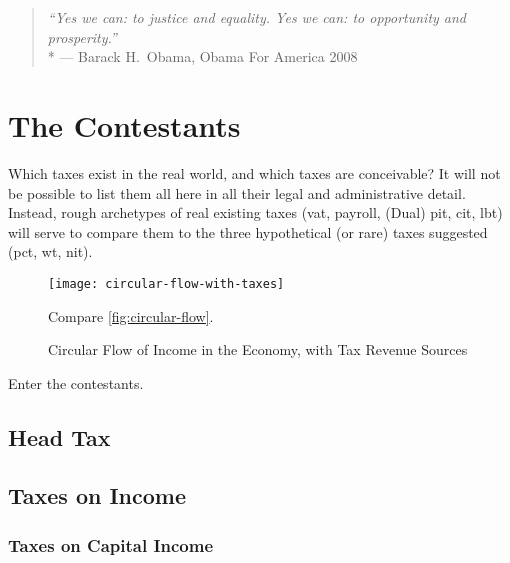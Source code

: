 

\begin{quote}
	\emph{``Yes we can:
	to justice and equality.
	Yes we can:
	to opportunity and prosperity.''}
	\\*
	--- Barack H.\ Obama, Obama For America 2008
\end{quote}

\section{The Contestants}
	\label{sec:contestants}
Which taxes exist in the real world, and which taxes are conceivable?
It will not be possible to list them all here in all their legal and administrative detail.
Instead, rough archetypes of real existing taxes (\gls{vat}, \gls{payroll}, (Dual) \gls{pit}, \gls{cit}, \gls{lbt}) will serve to compare them to the three hypothetical (or rare) taxes suggested (\gls{pct}, \gls{wt}, \gls{nit}).



\begin{figure}[htbp]
	\centering
	\texttt{[image: circular-flow-with-taxes]}
	\caption[Circular Flow in the Economy, with Taxes]{Circular Flow of Income in the Economy, with Tax Revenue Sources}
	\begin{flushleft}
		\scriptsize{Compare \autoref{fig:circular-flow}.}
		
	\end{flushleft}
	\label{fig:circular-flow-with-taxes}
\end{figure}

Enter the contestants.

\subsection{Head Tax}

\subsection{Taxes on Income}

\subsubsection{Taxes on Capital Income}


